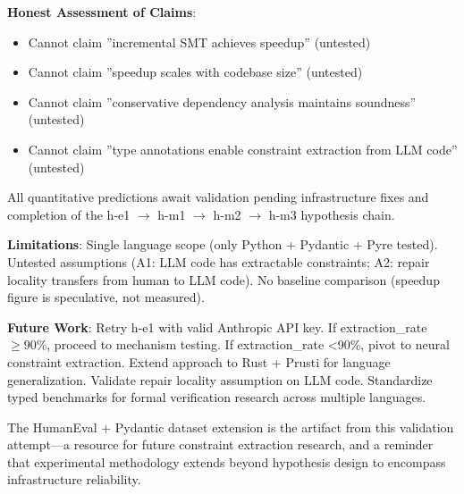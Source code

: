 \textbf{Honest Assessment of Claims}:
\begin{itemize}
\item Cannot claim ''incremental SMT achieves speedup'' (untested)
\item Cannot claim ''speedup scales with codebase size'' (untested)
\item Cannot claim ''conservative dependency analysis maintains soundness'' (untested)
\item Cannot claim ''type annotations enable constraint extraction from LLM code'' (untested)
\end{itemize}

All quantitative predictions await validation pending infrastructure fixes and completion of the h-e1 $\rightarrow$ h-m1 $\rightarrow$ h-m2 $\rightarrow$ h-m3 hypothesis chain.

\textbf{Limitations}: Single language scope (only Python + Pydantic + Pyre tested). Untested assumptions (A1: LLM code has extractable constraints; A2: repair locality transfers from human to LLM code). No baseline comparison (speedup figure is speculative, not measured).

\textbf{Future Work}: Retry h-e1 with valid Anthropic API key. If extraction\_rate $\geq 90$\%, proceed to mechanism testing. If extraction\_rate <90\%, pivot to neural constraint extraction. Extend approach to Rust + Prusti for language generalization. Validate repair locality assumption on LLM code. Standardize typed benchmarks for formal verification research across multiple languages.

The HumanEval + Pydantic dataset extension is the artifact from this validation attempt---a resource for future constraint extraction research, and a reminder that experimental methodology extends beyond hypothesis design to encompass infrastructure reliability.
